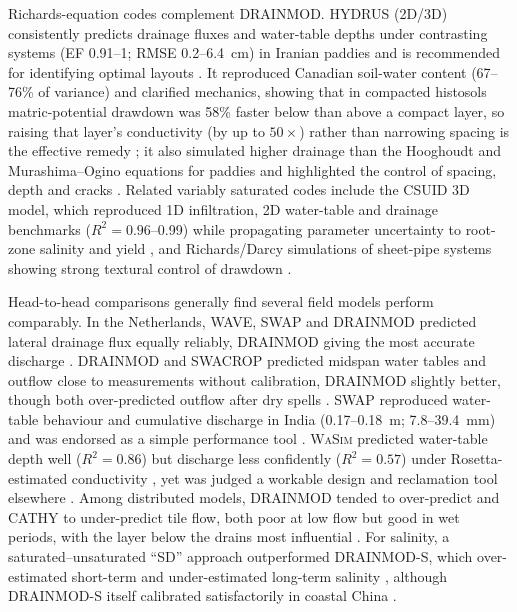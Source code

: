 Richards-equation codes complement \textsc{DRAINMOD}. HYDRUS (2D/3D) consistently predicts drainage fluxes and water-table depths under contrasting systems (EF 0.91--1; RMSE 0.2--6.4~cm) in Iranian paddies and is recommended for identifying optimal layouts \parencite{Karandish2018,DarziNaftchali2018}. It reproduced Canadian soil-water content (67--76\% of variance) and clarified mechanics, showing that in compacted histosols matric-potential drawdown was 58\% faster below than above a compact layer, so raising that layer's conductivity (by up to $50\times$) rather than narrowing spacing is the effective remedy \parencite{Mante2018,Guedessou2021}; it also simulated higher drainage than the Hooghoudt and Murashima--Ogino equations for paddies and highlighted the control of spacing, depth and cracks \parencite{Ebrahimian2015}. Related variably saturated codes include the CSUID 3D model, which reproduced 1D infiltration, 2D water-table and drainage benchmarks ($R^2=0.96$--0.99) while propagating parameter uncertainty to root-zone salinity and yield \parencite{Alzraiee2013b,Alzraiee2013}, and Richards/Darcy simulations of sheet-pipe systems showing strong textural control of drawdown \parencite{Saptomo2021,Li2021}.

Head-to-head comparisons generally find several field models perform comparably. In the Netherlands, WAVE, SWAP and \textsc{DRAINMOD} predicted lateral drainage flux equally reliably, \textsc{DRAINMOD} giving the most accurate discharge \parencite{ElSadek2001}. \textsc{DRAINMOD} and SWACROP predicted midspan water tables and outflow close to measurements without calibration, \textsc{DRAINMOD} slightly better, though both over-predicted outflow after dry spells \parencite{Prasher1996}. SWAP reproduced water-table behaviour and cumulative discharge in India (0.17--0.18~m; 7.8--39.4~mm) and was endorsed as a simple performance tool \parencite{Verma2014}. \textsc{WaSim} predicted water-table depth well ($R^2=0.86$) but discharge less confidently ($R^2=0.57$) under Rosetta-estimated conductivity \parencite{Malota2022}, yet was judged a workable design and reclamation tool elsewhere \parencite{Hirekhan2007,Malota2024}. Among distributed models, \textsc{DRAINMOD} tended to over-predict and CATHY to under-predict tile flow, both poor at low flow but good in wet periods, with the layer below the drains most influential \parencite{Muma2017}. For salinity, a saturated--unsaturated ``SD'' approach outperformed \textsc{DRAINMOD-S}, which over-estimated short-term and under-estimated long-term salinity \parencite{Nozari2021}, although \textsc{DRAINMOD-S} itself calibrated satisfactorily in coastal China \parencite{Feng2018}.

